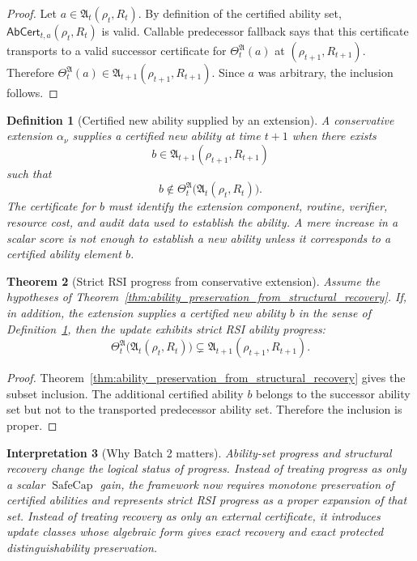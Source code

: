 \documentclass[11pt]{article}
\newtheorem{theorem}{Theorem}[section]
\newtheorem{definition}[theorem]{Definition}
\newtheorem{interpretation}[theorem]{Interpretation}
\newcommand{\1}{\mathbf{1}}
\providecommand{\SafeCap}{\operatorname{SafeCap}}
\begin{document}
\begin{proof}
Let \(a\in\mathfrak A_t(\rho_t,R_t)\).  By definition of the certified ability set, \(\mathsf{AbCert}_{t,a}(\rho_t,R_t)\) is valid.  Callable predecessor fallback says that this certificate transports to a valid successor certificate for \(\Theta_t^{\mathfrak A}(a)\) at \((\rho_{t+1},R_{t+1})\).  Therefore \(\Theta_t^{\mathfrak A}(a)\in\mathfrak A_{t+1}(\rho_{t+1},R_{t+1})\).  Since \(a\) was arbitrary, the inclusion follows.
\end{proof}

\begin{definition}[Certified new ability supplied by an extension]
\label{def:certified_new_ability_extension}
A conservative extension \(\alpha_\nu\) supplies a certified new ability at time \(t+1\) when there exists
\[
b\in\mathfrak A_{t+1}(\rho_{t+1},R_{t+1})
\]
such that
\[
b\notin \Theta_t^{\mathfrak A}\bigl(\mathfrak A_t(\rho_t,R_t)\bigr).
\]
The certificate for \(b\) must identify the extension component, routine, verifier, resource cost, and audit data used to establish the ability.  A mere increase in a scalar score is not enough to establish a new ability unless it corresponds to a certified ability element \(b\).
\end{definition}

\begin{theorem}[Strict RSI progress from conservative extension]
\label{thm:strict_rsi_progress_from_conservative_extension}
Assume the hypotheses of Theorem~\ref{thm:ability_preservation_from_structural_recovery}.  If, in addition, the extension supplies a certified new ability \(b\) in the sense of Definition~\ref{def:certified_new_ability_extension}, then the update exhibits strict RSI ability progress:
\[
\Theta_t^{\mathfrak A}\bigl(\mathfrak A_t(\rho_t,R_t)\bigr)
\subsetneq
\mathfrak A_{t+1}(\rho_{t+1},R_{t+1}).
\]
\end{theorem}

\begin{proof}
Theorem~\ref{thm:ability_preservation_from_structural_recovery} gives the subset inclusion.  The additional certified ability \(b\) belongs to the successor ability set but not to the transported predecessor ability set.  Therefore the inclusion is proper.
\end{proof}

\begin{interpretation}[Why Batch 2 matters]
Ability-set progress and structural recovery change the logical status of progress.  Instead of treating progress as only a scalar \(\SafeCap\) gain, the framework now requires monotone preservation of certified abilities and represents strict RSI progress as a proper expansion of that set.  Instead of treating recovery as only an external certificate, it introduces update classes whose algebraic form gives exact recovery and exact protected distinguishability preservation.
\end{interpretation}
\end{document}
